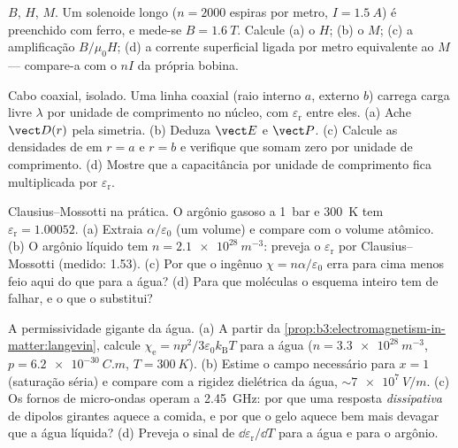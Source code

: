 \begin{exercise}[$\star$]\label{exo:b3:electromagnetism-in-matter:4}
$B$, $H$, $M$. Um solenoide longo ($n = \num{2000}$ espiras por metro,
$I = \qty{1.5}{A}$) é preenchido com ferro, e mede-se $B = \qty{1.6}{T}$.
Calcule (a) o $H$; (b) o $M$; (c) a amplificação
$B/\mu_0H$; (d) a corrente superficial ligada por metro equivalente ao
$M$ --- compare-a com o $nI$ da própria bobina.
\end{exercise}

\begin{exercise}[$\star\star$]\label{exo:b3:electromagnetism-in-matter:5}
Cabo coaxial, isolado. Uma linha coaxial (raio interno $a$, externo
$b$) carrega carga livre $\lambda$ por unidade de comprimento no núcleo,
com  $\varepsilon_{\text{r}}$ entre eles. (a) Ache
$\vect D(r)$ pela simetria. (b) Deduza $\vect E$ e $\vect P$.
(c) Calcule as densidades de  em $r = a$ e $r = b$ e
verifique que somam zero por unidade de comprimento. (d) Mostre que a
capacitância por unidade de comprimento fica multiplicada por $\varepsilon_{\text{r}}$.
\end{exercise}

\begin{exercise}[$\star\star$]\label{exo:b3:electromagnetism-in-matter:6}
Clausius--Mossotti na prática. O argônio gasoso a \qty{1}{bar} e
\qty{300}{K} tem $\varepsilon_{\text{r}} = 1.00052$. (a) Extraia
$\alpha/\varepsilon_0$ (um volume) e compare com o volume
atômico. (b) O argônio líquido tem $n = \qty{2.1e28}{m^{-3}}$: preveja
o $\varepsilon_{\text{r}}$ por Clausius--Mossotti (medido: 1.53).
(c) Por que o ingênuo $\chi = n\alpha/\varepsilon_0$ erra para cima
menos feio aqui do que para a água? (d) Para que moléculas o esquema
inteiro tem de falhar, e o que o substitui?
\end{exercise}

\begin{exercise}[$\star\star$]\label{exo:b3:electromagnetism-in-matter:7}
A permissividade gigante da água. (a) A partir da
\cref{prop:b3:electromagnetism-in-matter:langevin}, calcule
$\chi_{\text{e}} = np^2/3\varepsilon_0k_{\text{B}}T$ para a água
($n = \qty{3.3e28}{m^{-3}}$, $p = \qty{6.2e-30}{C.m}$,
$T = \qty{300}{K}$). (b) Estime o campo necessário para $x = 1$
(saturação séria) e compare com a rigidez dielétrica da água,
$\sim\qty{7e7}{V/m}$. (c) Os fornos de micro-ondas operam a \qty{2.45}{GHz}:
por que uma resposta \emph{dissipativa} de dipolos girantes aquece a
comida, e por que o gelo aquece bem mais devagar que a água líquida? (d)
Preveja o sinal de $\dd\varepsilon_{\text{r}}/\dd T$ para a água e para o
argônio.
\end{exercise}

